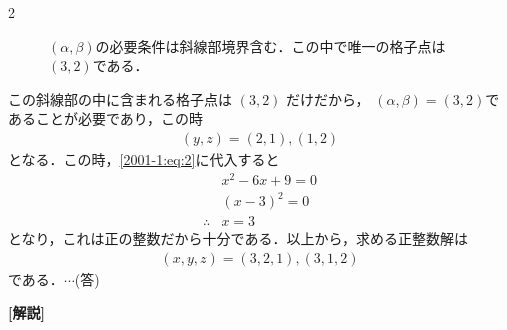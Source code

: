 \documentclass[../../../../main.tex]{subfiles}
\begin{document}
\begin{multicols}{2}
\begin{figure}[H]
        \caption{$(\alpha,\beta)$の必要条件は斜線部境界含む．この中で唯一の格子点は$(3,2)$である．}
        \label{2001-1:fig:1}
    \end{figure}

    この斜線部の中に含まれる格子点は $(3,2)$ だけだから，
    $(\alpha,\beta)=(3,2)$であることが必要であり，この時
    \begin{align*}
        (y,z)=(2,1),(1,2)
    \end{align*}
    となる．この時，\cref{2001-1:eq:2}に代入すると
    \begin{align*}
                   & x^2-6x+9=0 \\
                   & (x-3)^2=0  \\
        \therefore & x=3
    \end{align*}
    となり，これは正の整数だから十分である．以上から，求める正整数解は
    \begin{align*}
        (x,y,z)=(3,2,1), (3,1,2)
    \end{align*}
    である．$\cdots$(答)

    \vspace{10pt}
    {\bf[解説]}

    \newpage
\end{multicols}
\end{document}
